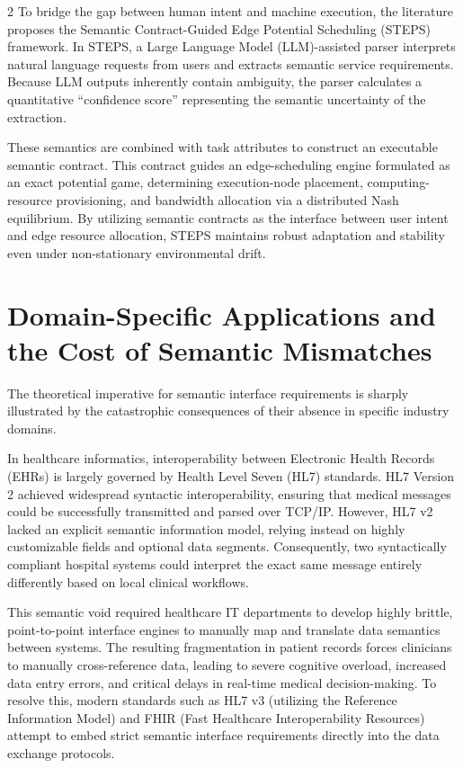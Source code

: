 \documentclass[11pt,letterpaper]{article}
\begin{document}
\begin{multicols*}{2}
To bridge the gap between human intent and machine execution, the literature proposes the Semantic Contract-Guided Edge Potential Scheduling (STEPS) framework. In STEPS, a Large Language Model (LLM)-assisted parser interprets natural language requests from users and extracts semantic service requirements. Because LLM outputs inherently contain ambiguity, the parser calculates a quantitative ``confidence score'' representing the semantic uncertainty of the extraction.

These semantics are combined with task attributes to construct an executable semantic contract. This contract guides an edge-scheduling engine formulated as an exact potential game, determining execution-node placement, computing-resource provisioning, and bandwidth allocation via a distributed Nash equilibrium. By utilizing semantic contracts as the interface between user intent and edge resource allocation, STEPS maintains robust adaptation and stability even under non-stationary environmental drift.

\section{Domain-Specific Applications and the Cost of Semantic Mismatches}
The theoretical imperative for semantic interface requirements is sharply illustrated by the catastrophic consequences of their absence in specific industry domains.

In healthcare informatics, interoperability between Electronic Health Records (EHRs) is largely governed by Health Level Seven (HL7) standards. HL7 Version 2 achieved widespread syntactic interoperability, ensuring that medical messages could be successfully transmitted and parsed over TCP/IP. However, HL7 v2 lacked an explicit semantic information model, relying instead on highly customizable fields and optional data segments. Consequently, two syntactically compliant hospital systems could interpret the exact same message entirely differently based on local clinical workflows.

This semantic void required healthcare IT departments to develop highly brittle, point-to-point interface engines to manually map and translate data semantics between systems. The resulting fragmentation in patient records forces clinicians to manually cross-reference data, leading to severe cognitive overload, increased data entry errors, and critical delays in real-time medical decision-making. To resolve this, modern standards such as HL7 v3 (utilizing the Reference Information Model) and FHIR (Fast Healthcare Interoperability Resources) attempt to embed strict semantic interface requirements directly into the data exchange protocols.


\end{multicols*}
\end{document}
